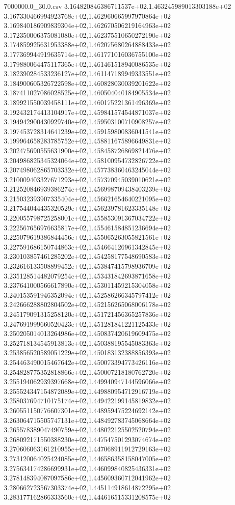 \begin{filecontents*}{7000000.0_30.0.csv}
3.164820846386711537e+02,1.463245989013303188e+02
3.167330466994923768e+02,1.462960665997970864e+02
3.169840186909839304e+02,1.462670506219164963e+02
3.172350006375081080e+02,1.462375510650272190e+02
3.174859925631953388e+02,1.462075680264888433e+02
3.177369944919635714e+02,1.461771016036755100e+02
3.179880064475117365e+02,1.461461518940086535e+02
3.182390284533236127e+02,1.461147189949333551e+02
3.184900605326722598e+02,1.460828030039201622e+02
3.187411027086028525e+02,1.460504040184905534e+02
3.189921550039458111e+02,1.460175221361496369e+02
3.192432174413104917e+02,1.459841574544871037e+02
3.194942900430929740e+02,1.459503100710908257e+02
3.197453728314641239e+02,1.459159800836041541e+02
3.199964658283785752e+02,1.458811675896649831e+02
3.202475690555631900e+02,1.458458726869821476e+02
3.204986825345324064e+02,1.458100954732826722e+02
3.207498062865703332e+02,1.457738360463245044e+02
3.210009403327671293e+02,1.457370945039010621e+02
3.212520846939386274e+02,1.456998709438403239e+02
3.215032393907335404e+02,1.456621654640221095e+02
3.217544044435320529e+02,1.456239781623335148e+02
3.220055798725258001e+02,1.455853091367034722e+02
3.222567656976635817e+02,1.455461584851236694e+02
3.225079619386844456e+02,1.455065263055821561e+02
3.227591686150744863e+02,1.454664126961342845e+02
3.230103857461285202e+02,1.454258177548690583e+02
3.232616133508899452e+02,1.453847415798936709e+02
3.235128514482079254e+02,1.453431842693871658e+02
3.237641000566617890e+02,1.453011459215304058e+02
3.240153591946352094e+02,1.452586266345797412e+02
3.242666288802804502e+02,1.452156265068006178e+02
3.245179091315258120e+02,1.451721456365257836e+02
3.247691999660520423e+02,1.451281841221125433e+02
3.250205014013264986e+02,1.450837420619609475e+02
3.252718134545913813e+02,1.450388195545083363e+02
3.253856520589051229e+02,1.450183132388856393e+02
3.254463490015467642e+02,1.450073394773426116e+02
3.254828775352818866e+02,1.450007218180762720e+02
3.255194062939397668e+02,1.449940947144596066e+02
3.255524347154872089e+02,1.449880954712916719e+02
3.258037694710175174e+02,1.449422199145819832e+02
3.260551150776607301e+02,1.448959475224692142e+02
3.263064715505747131e+02,1.448492783745068664e+02
3.265578389047490759e+02,1.448022125502520794e+02
3.268092171550388230e+02,1.447547501293074674e+02
3.270606063161210955e+02,1.447068911912729163e+02
3.273120064025424085e+02,1.446586358158047005e+02
3.275634174286699931e+02,1.446099840825436331e+02
3.278148394087097586e+02,1.445609360712041962e+02
3.280662723567303374e+02,1.445114918614872295e+02
3.283177162866333560e+02,1.444616515331208575e+02

\end{filecontents*}
